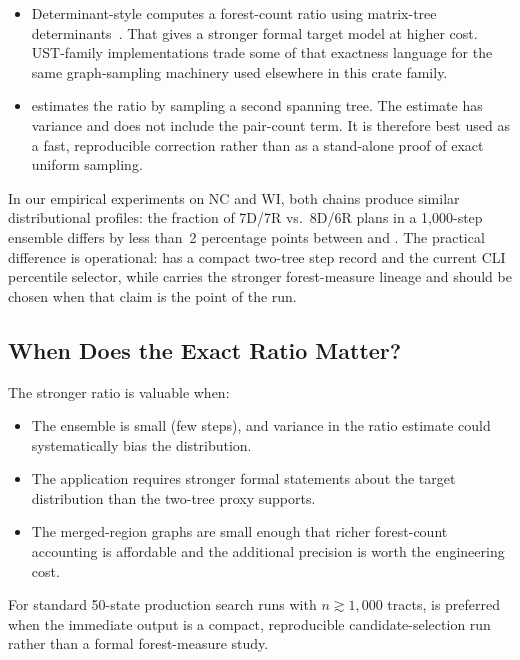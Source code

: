 \begin{itemize}
  \item Determinant-style \forestrecom{} computes a forest-count ratio using
        matrix-tree determinants~\citep{mccartan2020}.
        That gives a stronger formal target model at higher cost.
        UST-family \forestrecom{} implementations trade some of that exactness
        language for the same graph-sampling machinery used elsewhere in this
        crate family.

  \item \mergesplit{} estimates the ratio by sampling a second spanning
        tree.
        The estimate has variance and does not include the pair-count term.
        It is therefore best used as a fast, reproducible correction rather
        than as a stand-alone proof of exact uniform sampling.
\end{itemize}

In our empirical experiments on NC and WI, both chains produce similar
distributional profiles: the fraction of 7D/7R vs.\ 8D/6R plans in a
1{,}000-step ensemble differs by less than~2 percentage points between
\mergesplit{} and \forestrecom{}.
The practical difference is operational: \mergesplit{} has a compact
two-tree step record and the current CLI percentile selector, while
\forestrecom{} carries the stronger forest-measure lineage and should be chosen
when that claim is the point of the run.

\subsection{When Does the Exact Ratio Matter?}

The stronger \forestrecom{} ratio is valuable when:
\begin{itemize}
  \item The ensemble is small (few steps), and variance in the ratio
        estimate could systematically bias the distribution.
  \item The application requires stronger formal statements about the target
        distribution than the \mergesplit{} two-tree proxy supports.
  \item The merged-region graphs are small enough that richer forest-count
        accounting is affordable and the additional precision is worth the
        engineering cost.
\end{itemize}

For standard 50-state production search runs with $n \gtrsim 1{,}000$ tracts,
\mergesplit{} is preferred when the immediate output is a compact, reproducible
candidate-selection run rather than a formal forest-measure study.

